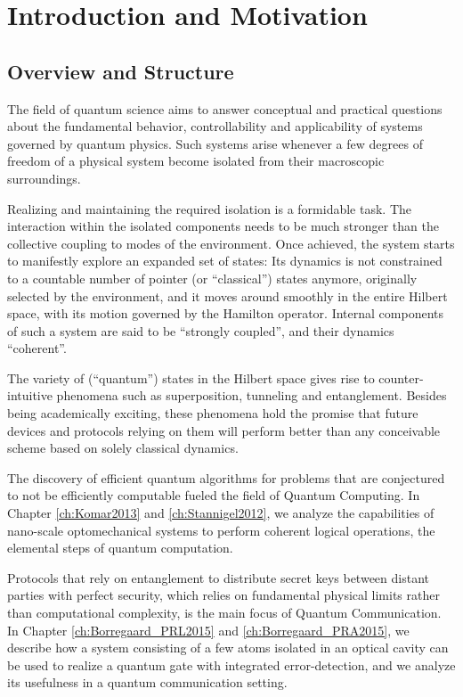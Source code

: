 \chapter{Introduction and Motivation}

\section{Overview and Structure}
The field of quantum science aims to answer conceptual and practical questions
about the fundamental behavior, controllability and applicability of 
systems governed by quantum physics. Such systems arise whenever a few 
degrees of freedom of a physical system become isolated from their macroscopic
surroundings. 

Realizing and maintaining the required isolation is a formidable
task. The interaction within the isolated components needs to be
much stronger than the collective coupling to modes of the environment.
Once achieved, the system starts to manifestly explore an expanded set of states: Its
dynamics is not constrained to a countable number of pointer (or
``classical'') states anymore, originally selected by the environment, and it
moves around smoothly in the entire Hilbert space, with its motion governed by the
Hamilton operator. Internal components of such a system are said to be ``strongly
coupled'', and their dynamics ``coherent''.

The variety of (``quantum'') states in the Hilbert space  gives rise
to counter-intuitive phenomena such as superposition, tunneling and
entanglement.
Besides being academically exciting, these phenomena hold the promise that
future devices and protocols relying on them will perform better than any
conceivable scheme based on solely classical dynamics. 

The discovery of
efficient quantum algorithms for problems that are conjectured to not be
efficiently computable fueled the field of Quantum Computing. In Chapter
\ref{ch:Komar2013} and \ref{ch:Stannigel2012}, we analyze the
capabilities of nano-scale optomechanical systems to perform coherent logical
operations, the elemental steps of quantum computation.

Protocols that
rely on entanglement to distribute secret keys between distant parties with
perfect security, which relies on fundamental physical limits rather than
computational complexity, is the main focus of Quantum Communication. In Chapter
\ref{ch:Borregaard_PRL2015} and \ref{ch:Borregaard_PRA2015}, we describe how a system consisting of a few atoms
isolated in an optical cavity can be used to realize a quantum gate with
integrated error-detection, and we analyze its usefulness in a quantum
communication setting.

